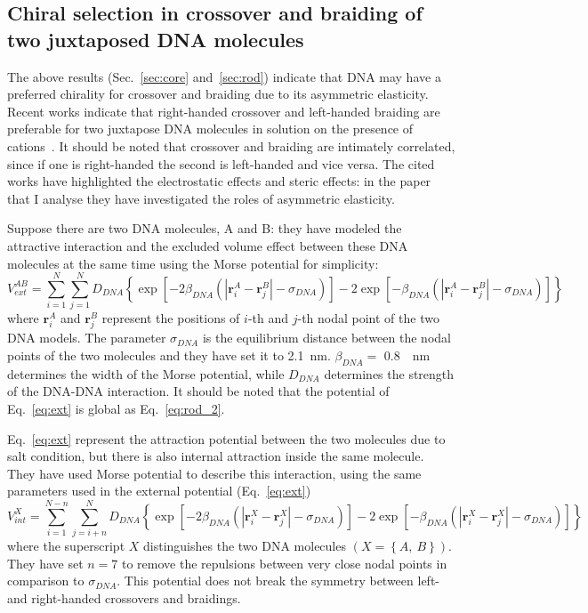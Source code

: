 \documentclass[a4paper,10pt]{article}
\begin{document}
\subsection{Chiral selection in crossover and braiding of two juxtaposed DNA molecules}\label{sec:braF}
The above results (Sec.~\ref{sec:core} and~\ref{sec:rod}) indicate that DNA may have a preferred chirality for crossover and braiding due to its asymmetric elasticity.
Recent works indicate that right-handed crossover and left-handed braiding are preferable for two juxtapose DNA molecules in solution on the presence of cations~\cite{br_1, br_2, br_3, br_4, br_5}.
It should be noted that crossover and braiding are intimately correlated, since if one is right-handed the second is left-handed and vice versa.
The cited works have highlighted the electrostatic effects and steric effects: in the paper that I analyse they have investigated the roles of asymmetric elasticity.

Suppose there are two DNA molecules, A and B: they have modeled the attractive interaction and the excluded volume effect between these DNA molecules at the same time using the Morse potential for simplicity:
\begin{equation}\label{eq:ext}
V_{ext}^{AB}=\sum_{i=1}^{N}\sum_{j=1}^{N}D_{DNA}\left \{\exp\left [-2\beta_{DNA}\left (\left |\textbf{r}_{i}^{A}-\textbf{r}_{j}^{B}\right |-\sigma_{DNA}\right )\right ]-2\exp\left [-\beta_{DNA}\left (\left |\textbf{r}_{i}^{A}-\textbf{r}_{j}^{B}\right |-\sigma_{DNA}\right )\right ]\right \}
\end{equation}
where $\textbf{r}_{i}^{A}$ and $\textbf{r}_{j}^{B}$ represent the positions of $i$-th and $j$-th nodal point of the two DNA models.
The parameter $\sigma_{DNA}$ is the equilibrium distance between the nodal points of the two molecules and they have set it to \SI{2.1}{\nm}.
$\beta_{DNA}=$ \SI{0.8}{\per\nm} determines the width of the Morse potential, while $D_{DNA}$ determines the strength of the DNA-DNA interaction.
It should be noted that the potential of Eq.~\ref{eq:ext} is global as Eq.~\ref{eq:rod_2}.

Eq.~\ref{eq:ext} represent the attraction potential between the two molecules due to salt condition, but there is also internal attraction inside the same molecule.
They have used Morse potential to describe this interaction, using the same parameters used in the external potential (Eq.~\ref{eq:ext})
\begin{equation}\label{eq:int}
V_{int}^{X}=\sum_{i=1}^{N-n}\sum_{j=i+n}^{N}D_{DNA}\left \{\exp\left [-2\beta_{DNA}\left (\left |\textbf{r}_{i}^{X}-\textbf{r}_{j}^{X}\right |-\sigma_{DNA}\right )\right ]-2\exp\left [-\beta_{DNA}\left (\left |\textbf{r}_{i}^{X}-\textbf{r}_{j}^{X}\right |-\sigma_{DNA}\right )\right ]\right \}
\end{equation}
where the superscript $X$ distinguishes the two DNA molecules $\left (X=\left \{A,\ B\right \}\right )$.
They have set $n=7$ to remove the repulsions between very close nodal points in comparison to $\sigma_{DNA}$.
This potential does not break the symmetry between left- and right-handed crossovers and braidings.
\end{document}
